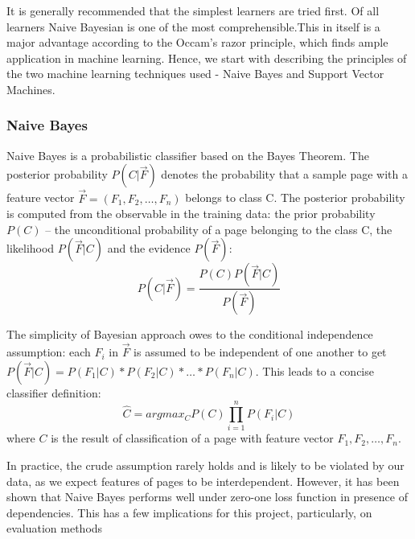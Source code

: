 \documentclass[12pt,notitlepage,twoside]{scrreprt}
\begin{document}
It is generally recommended that the simplest learners are tried
first\cite{domingos}. Of all learners Naive Bayesian is one of the most
comprehensible.This in itself is a major advantage according to the Occam's
razor principle, which finds ample application in machine learning.
Hence, we start with describing the principles of the two machine learning
techniques used - Naive Bayes and Support Vector Machines.

\subsubsection*{Naive Bayes}

Naive Bayes is a probabilistic classifier based on the Bayes Theorem. The
posterior probability \(P(C|\vec{F})\) denotes the probability that a sample
page with a feature vector \(\vec{F}=(F_1,F_2,\dots,F_n)\) belongs to class C.
The posterior probability is computed from the observable in the training data: the prior
probability \(P(C)\) -- the unconditional probability of a page belonging to
the class C, the likelihood \(P(\vec{F}|C)\) and the evidence \(P(\vec{F})\):
\begin{equation}
P(C|\vec{F}) = \frac{P(C)P(\vec{F}|C)}{P(\vec{F})}
\end{equation}

The simplicity of Bayesian approach owes to the conditional independence
assumption: each \(F_i\) in \(\vec{F}\) is assumed to be independent of one
another to get \(P(\vec{F}|C)=P(F_1|C)*P(F_2|C)*\dots*P(F_n|C)\). This leads to a concise classifier definition:
\begin{equation}
\hat{C}= argmax_C P(C)\prod_{i=1}^{n}P(F_i|C)
\end{equation}
where \(C\) is the result of classification of a page with feature vector
\(F_1,F_2,\dots,F_n\).

In practice, the crude assumption rarely  holds and is likely to
be violated by our data, as we expect features of pages to be interdependent.
However, it has been shown that Naive Bayes performs well under zero-one loss
function in presence of dependencies\cite{OPTIM}. This has a few
implications for this project, particularly, on evaluation methods 
\end{document}
